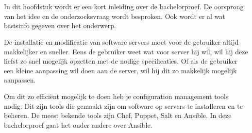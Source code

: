
\chapter{}
\label{ch:inleiding}
In dit hoofdstuk wordt er een kort inleiding over de bachelorproef. De oorsprong van het idee en de onderzoeksvraag wordt besproken. Ook wordt er al wat basisinfo gegeven over het onderwerp.


De installatie en modificatie van software servers moet voor de gebruiker altijd makkelijker en sneller. Eens de gebruiker weet wat voor server hij wil, wil hij deze liefst zo snel mogelijk opzetten met de nodige specificaties. Of als de gebruiker een kleine aanpassing wil doen aan de server, wil hij dit zo makkelijk mogelijk aanpassen. 

Om dit zo efficiënt mogelijk te doen heb je configuration management tools nodig. Dit zijn tools die gemaakt zijn om software op servers te installeren en te beheren. De meest bekende tools zijn Chef, Puppet, Salt en Ansible. In deze bachelorproef gaat het onder andere over Ansible. 



\section{}
\label{sec:context}

